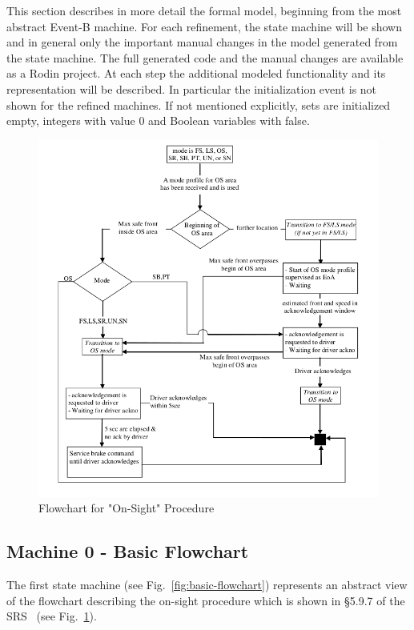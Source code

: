 \documentclass{template/openetcs_article}
\begin{document}
This section describes in more detail the formal model, beginning from the most
abstract Event-B machine.  For each refinement, the state machine will be shown
and in general only the important manual changes in the model generated from the
state machine. The full generated code and the manual changes are available as a
Rodin project. At each step the additional modeled functionality and its
representation will be described. In particular the initialization event is not
shown for the refined machines. If not mentioned explicitly, sets are
initialized empty, integers with value 0 and Boolean variables with false.

\begin{figure}[ht]
  \centering
  \includegraphics[width=.75\textwidth]{FlowChart}
  \caption{Flowchart for "On-Sight" Procedure~\cite{SRS-026-330}}
  \label{fig:flowchart-OS-mode}
\end{figure}

\subsection{Machine 0 - Basic Flowchart}
\label{sec:machine-0-basic}

The first state machine  (see Fig.~\ref{fig:basic-flowchart})
represents an abstract view of the flowchart describing the on-sight procedure
which is shown in §5.9.7 of the SRS~\cite{SRS-026-330} (see
Fig.~\ref{fig:flowchart-OS-mode}).
\end{document}
